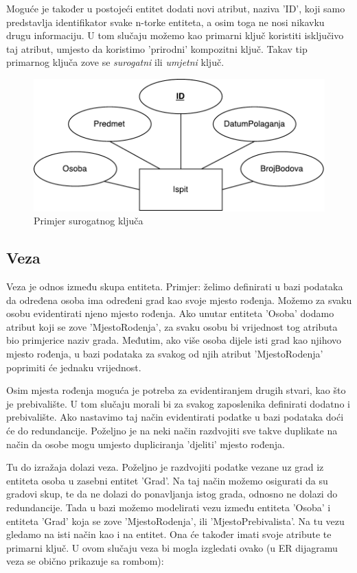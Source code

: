 \documentclass[times, utf8, zavrsni]{fer}
\begin{document}
Moguće je također u postojeći entitet dodati novi atribut, naziva 'ID', koji samo predstavlja identifikator svake n-torke entiteta, a osim toga ne nosi nikavku drugu informaciju. U tom slučaju možemo kao primarni ključ koristiti isključivo taj atribut, umjesto da koristimo 'prirodni' kompozitni ključ. Takav tip primarnog ključa zove se \emph{surogatni} ili \emph{umjetni} ključ.\\


\begin{figure}[H]
\centering
\includegraphics[scale=0.8]{img/sur-ispit.pdf}
\caption{Primjer surogatnog ključa}
\label{fig:sur-ispit}
\end{figure}
\clearpage

\subsection{Veza}

Veza je odnos između skupa entiteta.
Primjer: želimo definirati u bazi podataka da određena osoba ima određeni grad kao svoje mjesto rođenja. Možemo za svaku osobu evidentirati njeno mjesto rođenja. Ako unutar entiteta 'Osoba' dodamo atribut koji se zove 'MjestoRodenja', za svaku osobu bi vrijednost tog atributa bio primjerice naziv grada. Međutim, ako više osoba dijele isti grad kao njihovo mjesto rođenja, u bazi podataka za svakog od njih atribut 'MjestoRodenja' poprimiti će jednaku vrijednost.

Osim mjesta rođenja moguća je potreba za evidentiranjem drugih stvari, kao što je prebivalište. U tom slučaju morali bi za svakog zaposlenika definirati dodatno i prebivalište. Ako nastavimo taj način evidentirati podatke u bazi podataka doći će do redundancije. Poželjno je na neki način razdvojiti sve takve duplikate na način da osobe mogu umjesto dupliciranja 'djeliti' mjesto rođenja.

Tu do izražaja dolazi veza. Poželjno je razdvojiti podatke vezane uz grad iz entiteta osoba u zasebni entitet 'Grad'. Na taj način možemo osigurati da su gradovi skup, te da ne dolazi do ponavljanja istog grada, odnosno ne dolazi do redundancije. Tada u bazi možemo modelirati vezu između entiteta 'Osoba' i entiteta 'Grad' koja se zove 'MjestoRodenja', ili 'MjestoPrebivalista'. Na tu vezu gledamo na isti način kao i na entitet. Ona će također imati svoje atribute te primarni ključ. U ovom slučaju veza bi mogla izgledati ovako (u ER dijagramu veza se obično prikazuje sa rombom):
\end{document}

